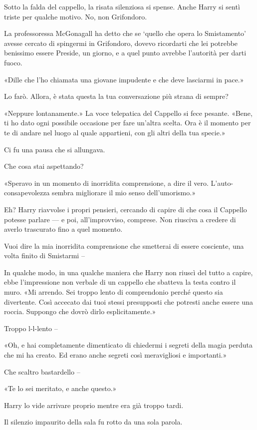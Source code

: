 Sotto la falda del cappello, la risata silenziosa si spense. Anche Harry si sentì triste per qualche motivo. No, non Grifondoro.

La professoressa McGonagall ha detto che se ‘quello che opera lo Smistamento’ avesse cercato di spingermi in Grifondoro, dovevo ricordarti che lei potrebbe benissimo essere Preside, un giorno, e a quel punto avrebbe l’autorità per darti fuoco.

«Dille che l’ho chiamata una giovane impudente e che deve lasciarmi in pace.»

Lo farò. Allora, è stata questa la tua conversazione più strana di sempre?

«Neppure lontanamente.» La voce telepatica del Cappello si fece pesante. «Bene, ti ho dato ogni possibile occasione per fare un’altra scelta. Ora è il momento per te di andare nel luogo al quale appartieni, con gli altri della tua specie.»

Ci fu una pausa che si allungava.

Che cosa stai aspettando?

«Speravo in un momento di inorridita comprensione, a dire il vero. L’auto-consapevolezza sembra migliorare il mio senso dell’umorismo.»

Eh? Harry riavvolse i propri pensieri, cercando di capire di che cosa il Cappello potesse parlare — e poi, all’improvviso, comprese. Non riusciva a credere di averlo trascurato fino a quel momento.

Vuoi dire la mia inorridita comprensione che smetterai di essere cosciente, una volta finito di Smistarmi –

In qualche modo, in una qualche maniera che Harry non riuscì del tutto a capire, ebbe l’impressione non verbale di un cappello che sbatteva la testa contro il muro. «Mi arrendo. Sei troppo lento di comprendonio perché questo sia divertente. Così accecato dai tuoi stessi presupposti che potresti anche essere una roccia. Suppongo che dovrò dirlo esplicitamente.»

Troppo l-l-lento –

«Oh, e hai completamente dimenticato di chiedermi i segreti della magia perduta che mi ha creato. Ed erano anche segreti così meravigliosi e importanti.»

Che scaltro bastardello –

«Te lo sei meritato, e anche questo.»

Harry lo vide arrivare proprio mentre era già troppo tardi.

Il silenzio impaurito della sala fu rotto da una sola parola.

